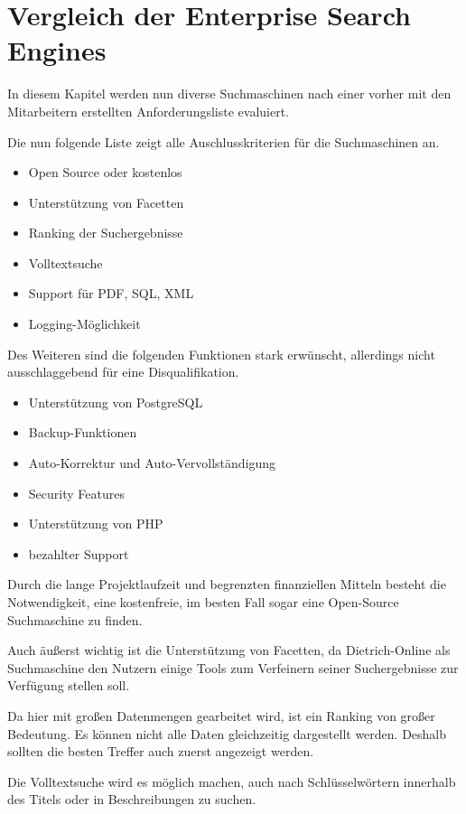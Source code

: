 \chapter{Vergleich der Enterprise Search Engines}

In diesem Kapitel werden nun diverse Suchmaschinen nach einer vorher mit den Mitarbeitern erstellten Anforderungsliste evaluiert.

Die nun folgende Liste zeigt alle Auschlusskriterien für die Suchmaschinen an.
\begin{itemize}
    \item Open Source oder kostenlos
    \item Unterstützung von Facetten
    \item Ranking der Suchergebnisse
    \item Volltextsuche
    \item Support für PDF, SQL, XML
    \item Logging-Möglichkeit
\end{itemize}

Des Weiteren sind die folgenden Funktionen stark erwünscht, allerdings nicht ausschlaggebend für eine Disqualifikation.

\begin{itemize}
    \item Unterstützung von PostgreSQL
    \item Backup-Funktionen
    \item Auto-Korrektur und Auto-Vervollständigung
    \item Security Features
    \item Unterstützung von PHP
    \item bezahlter Support
\end{itemize}

Durch die lange Projektlaufzeit und begrenzten finanziellen Mitteln besteht die Notwendigkeit, eine kostenfreie, im besten Fall sogar eine Open-Source Suchmaschine zu finden. 

Auch äußerst wichtig ist die Unterstützung von Facetten, da Dietrich-Online als Suchmaschine den Nutzern einige Tools zum Verfeinern seiner Suchergebnisse zur Verfügung stellen soll.

Da hier mit großen Datenmengen gearbeitet wird, ist ein Ranking von großer Bedeutung. Es können nicht alle Daten gleichzeitig dargestellt werden. Deshalb sollten die besten Treffer auch zuerst angezeigt werden.

Die Volltextsuche wird es möglich machen, auch nach Schlüsselwörtern innerhalb des Titels oder in Beschreibungen zu suchen.

